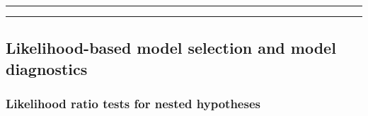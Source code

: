 \documentclass[]{article}
\begin{document}
\begin{center}\rule{0.5\linewidth}{\linethickness}\end{center}

\begin{center}\rule{0.5\linewidth}{\linethickness}\end{center}

\subsection{Likelihood-based model selection and model
diagnostics}\label{likelihood-based-model-selection-and-model-diagnostics}

\subsubsection{Likelihood ratio tests for nested
hypotheses}\label{likelihood-ratio-tests-for-nested-hypotheses}
\end{document}
